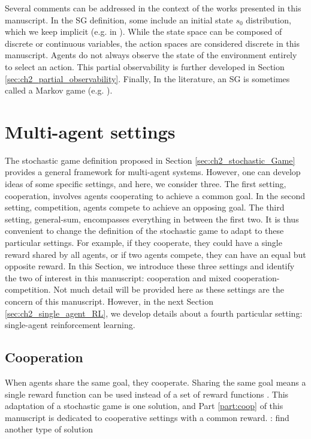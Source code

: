 Several comments can be addressed in the context of the works presented in this manuscript.
In the SG definition, some include an initial state $s_0$ distribution, which we keep implicit (e.g. in \citep{marl-book}).
While the state space can be composed of discrete or continuous variables, the action spaces are considered discrete in this manuscript.
Agents do not always observe the state of the environment entirely to select an action.
This partial observability is further developed in Section \ref{sec:ch2_partial_observability}.
Finally, In the literature, an SG is sometimes called a Markov game (e.g. \citep{MarkovGames}).

\section{Multi-agent settings} 
\label{sec:ch2_multi_agent_settings}
The stochastic game definition proposed in Section \ref{sec:ch2_stochastic_Game} provides a general framework for multi-agent systems.
However, one can develop ideas of some specific settings, and here, we consider three.
The first setting, cooperation, involves agents cooperating to achieve a common goal.
In the second setting, competition, agents compete to achieve an opposing goal.
The third setting, general-sum, encompasses everything in between the first two.
It is thus convenient to change the definition of the stochastic game to adapt to these particular settings.
For example, if they cooperate, they could have a single reward shared by all agents, or if two agents compete, they can have an equal but opposite reward.
In this Section, we introduce these three settings and identify the two of interest in this manuscript: cooperation and mixed cooperation-competition.
Not much detail will be provided here as these settings are the concern of this manuscript.
However, in the next Section \ref{sec:ch2_single_agent_RL}, we develop details about a fourth particular setting: single-agent reinforcement learning.

\subsection{Cooperation} 
\label{sec:ch2_Cooperation}
When agents share the same goal, they cooperate.
Sharing the same goal means a single reward function can be used instead of a set of reward functions \citep{}.
This adaptation of a stochastic game is one solution, and Part \ref{part:coop} of this manuscript is dedicated to cooperative settings with a common reward.
\todo: find another type of solution

